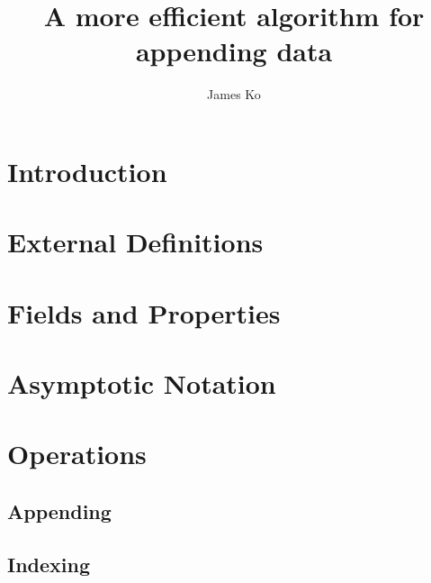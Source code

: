 \documentclass{article}
\title{A more efficient algorithm for appending data}
\author{James Ko}
\begin{document}
	\begin{titlepage}
		\maketitle
	\end{titlepage}
	
	\begin{abstract}
		
	\end{abstract}

	\newpage

	\section{Introduction}

	
	
	\section{External Definitions}
	
	
	
	\section{Fields and Properties}
	
	
	
	\section{Asymptotic Notation}
	
	
	
	\section{Operations}
	
	
	
	\subsection{Appending}
	\label{subsec:Appending}
	
	
	
	
	
	
	
	
	
	\subsection{Indexing}
	\label{subsec:Indexing}
	
\end{document}
